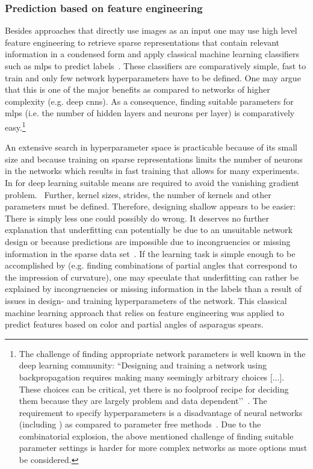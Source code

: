 \subsubsection{Prediction based on feature engineering}
\label{subsec:FeatureEngineering}

Besides approaches that directly use images as an input one may use high level feature engineering to retrieve sparse representations that contain relevant information in a condensed form and apply classical machine learning classifiers such as \acrshort{mlp}s to predict labels~\citep{zheng2018feature}. These classifiers are comparatively simple, fast to train and only few network hyperparameters have to be defined. One may argue that this is one of the major benefits as compared to networks of higher complexity (e.g. deep \acrshort{cnn}s). As a consequence, finding suitable parameters for \acrshort{mlp}s (i.e. the number of hidden layers and neurons per layer) is comparatively easy.\footnote{The challenge of finding appropriate network parameters is well known in the deep learning community: ``Designing and training a network using backpropagation requires making many seemingly arbitrary choices [...]. These choices can be critical, yet there is no foolproof recipe for deciding them because they are largely problem and data dependent’’~\citep{lecun2012efficient}. The requirement to specify hyperparameters is a disadvantage of neural networks (including ) as compared to parameter free methods~\citep{scikit2019neural}. Due to the combinatorial explosion, the above mentioned challenge of finding suitable parameter settings is harder for more complex networks as more options must be considered.}

An extensive search in hyperparameter space is practicable because of its small size and because training on sparse representations limits the number of neurons in the networks which results in fast training that allows for many experiments. In  for deep learning suitable means are required to avoid the vanishing gradient problem.~\citep{wang2019vanishing} Further, kernel sizes, strides, the number of kernels and other parameters must be defined. Therefore, designing shallow  appears to be easier: There is simply less one could possibly do wrong. It deserves no further explanation that underfitting can potentially be due to an unsuitable network design or because predictions are impossible due to incongruencies or missing information in the sparse data set~\citep{lecun2012efficient}. If the learning task is simple enough to be accomplished by  (e.g. finding combinations of partial angles that correspond to the impression of curvature), one may speculate that underfitting can rather be explained by incongruencies or missing information in the labels than a result of issues in design- and training hyperparameters of the network. This classical machine learning approach that relies on feature engineering was applied to predict features based on color and partial angles of asparagus spears.

